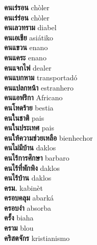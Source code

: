 \textbf{ คนเร่รอน  } chòler \\
\textbf{ คนเร่ร่อน  } chòler \\
\textbf{ คนเลวทราม  } diabel \\
\textbf{ คนเอเชีย  } asiátiko \\
\textbf{ คนแขวน  } enano \\
\textbf{ คนแคระ  } enano \\
\textbf{ คนแจกไพ่  } dealer \\
\textbf{ คนแบกหาม  } transportadó \\
\textbf{ คนแปลกหน้า  } estranhero \\
\textbf{ คนแอฟริกา  } Africano \\
\textbf{ คนโหดร้าย  } bestia \\
\textbf{ คนในชาติ  } pais \\
\textbf{ คนในประเทศ  } pais \\
\textbf{ คนให้ความช่วยเหลือ  } bienhechor \\
\textbf{ คนไม่มีบ้าน  } daklos \\
\textbf{ คนไร้การศึกษา  } barbaro \\
\textbf{ คนไร้ที่พักพิง  } daklos \\
\textbf{ คนไร้บ้าน  } daklos \\
\textbf{ ครม.  } kabinèt \\
\textbf{ ครอบคลุม  } abarká \\
\textbf{ ครอบงำ  } absorba \\
\textbf{ ครั้ง  } biaha \\
\textbf{ คราม  } blou \\
\textbf{ คริสตจักร  } kristianismo \\
